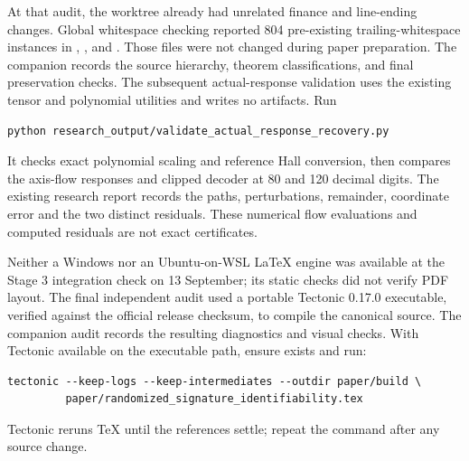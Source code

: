 \documentclass[11pt,a4paper]{article}
\numberwithin{equation}{section}
\theoremstyle{definition}
\theoremstyle{remark}
\begin{document}
At that audit, the worktree already had unrelated finance and line-ending
changes. Global whitespace checking reported 804 pre-existing
trailing-whitespace instances in ,
, and .
Those files were not changed during paper preparation. The companion
 records the source
hierarchy, theorem classifications, and final preservation checks.
The subsequent actual-response validation uses the existing tensor and
polynomial utilities and writes no artifacts. Run
\begin{verbatim}
python research_output/validate_actual_response_recovery.py
\end{verbatim}
It checks exact polynomial scaling and reference Hall conversion, then
compares the axis-flow responses and clipped decoder at 80 and 120 decimal
digits. The existing research report records the paths, perturbations,
remainder, coordinate error and the two distinct residuals. These numerical
flow evaluations and computed residuals are not exact certificates.

Neither a Windows nor an Ubuntu-on-WSL LaTeX engine was available at the
Stage 3 integration check on 13 September; its static checks did not
verify PDF layout. The final independent audit used a portable Tectonic
0.17.0 executable, verified against the official release checksum, to
compile the canonical source. The companion audit records the resulting
diagnostics and visual checks. With Tectonic available on the executable
path, ensure  exists and run:
\begin{verbatim}
tectonic --keep-logs --keep-intermediates --outdir paper/build \
         paper/randomized_signature_identifiability.tex
\end{verbatim}
Tectonic reruns TeX until the references settle; repeat the command after
any source change.
\end{document}
